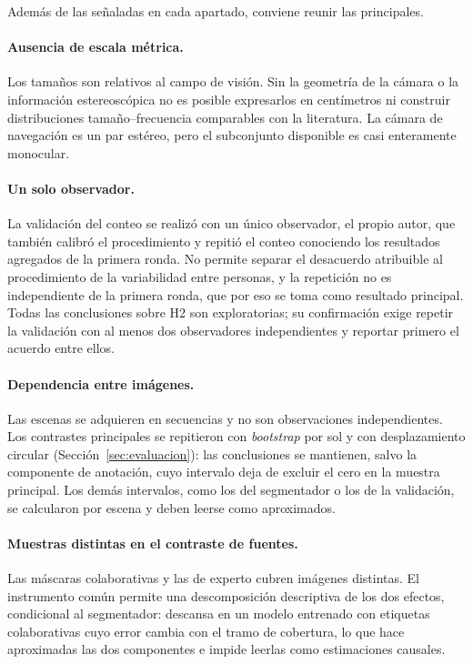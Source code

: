 Además de las señaladas en cada apartado, conviene reunir las principales.

\paragraph{Ausencia de escala métrica.} Los tamaños son relativos al campo de visión. Sin la
geometría de la cámara o la información estereoscópica no es posible expresarlos en
centímetros ni construir distribuciones tamaño--frecuencia comparables con la literatura. La cámara de navegación es un par estéreo, pero el subconjunto disponible es casi
enteramente monocular.

\paragraph{Un solo observador.} La validación del conteo se realizó con un único observador, el
propio autor, que también calibró el procedimiento y repitió el conteo conociendo los resultados
agregados de la primera ronda. No permite separar el desacuerdo atribuible al procedimiento de la
variabilidad entre personas, y la repetición no es independiente de la primera ronda, que por eso
se toma como resultado principal. Todas las conclusiones sobre H2 son exploratorias; su confirmación exige repetir la
validación con al menos dos observadores independientes y reportar primero el acuerdo entre
ellos.

\paragraph{Dependencia entre imágenes.} Las escenas se adquieren en secuencias y no son
observaciones independientes. Los contrastes principales se repitieron con \textit{bootstrap}
por sol y con desplazamiento circular (Sección~\ref{sec:evaluacion}): las conclusiones se
mantienen, salvo la componente de anotación, cuyo intervalo deja de excluir el cero en la
muestra principal. Los demás intervalos, como los del segmentador o los de la validación, se
calcularon por escena y deben leerse como aproximados.

\paragraph{Muestras distintas en el contraste de fuentes.} Las máscaras colaborativas y las de
experto cubren imágenes distintas. El instrumento común permite una descomposición descriptiva
de los dos efectos, condicional al segmentador: descansa en un modelo entrenado con etiquetas
colaborativas cuyo error cambia con el tramo de cobertura, lo que hace aproximadas las dos
componentes e impide leerlas como estimaciones causales.

